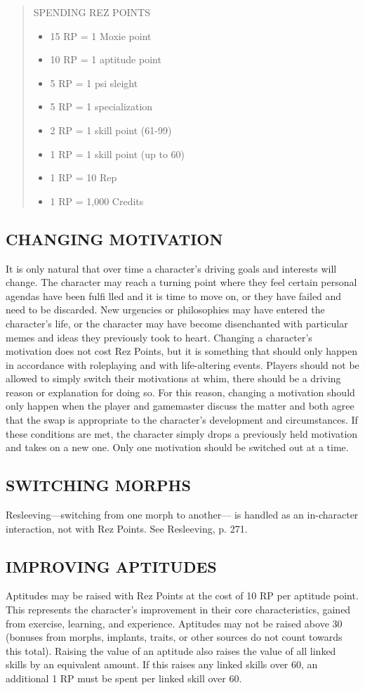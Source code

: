 \begin{quotation}
SPENDING REZ POINTS

\begin{itemize}
\item 15 RP = 1 Moxie point
\item 10 RP = 1 aptitude point
\item 5 RP = 1 psi sleight
\item 5 RP = 1 specialization
\item 2 RP = 1 skill point (61-99)
\item 1 RP = 1 skill point (up to 60)
\item 1 RP = 10 Rep
\item 1 RP = 1,000 Credits
\end{itemize}
\end{quotation}

 \subsection{CHANGING MOTIVATION}
It is only natural that over time a character’s driving
goals and interests will change. The character may
reach a turning point where they feel certain personal
agendas have been fulfi lled and it is time to move on,
or they have failed and need to be discarded. New
urgencies or philosophies may have entered the
character’s life, or the character may have become
disenchanted with particular memes and ideas they
previously took to heart.
Changing a character’s motivation does not cost
Rez Points, but it is something that should only
happen in accordance with roleplaying and with
life-altering events. Players should not be allowed
to simply switch their motivations at whim, there
should be a driving reason or explanation for doing
so. For this reason, changing a motivation should only
happen when the player and gamemaster discuss the
matter and both agree that the swap is appropriate to
the character’s development and circumstances.
If these conditions are met, the character simply
drops a previously held motivation and takes on a
new one. Only one motivation should be switched
out at a time.

 \subsection{SWITCHING MORPHS}
Resleeving—switching from one morph to another—
is handled as an in-character interaction, not with Rez
Points. See Resleeving, p. 271.

 \subsection{IMPROVING APTITUDES}
Aptitudes may be raised with Rez Points at the cost of
10 RP per aptitude point. This represents the character’s
improvement in their core characteristics, gained
from exercise, learning, and experience. Aptitudes may
not be raised above 30 (bonuses from morphs, implants,
traits, or other sources do not count towards
this total).
Raising the value of an aptitude also raises the
value of all linked skills by an equivalent amount. If
this raises any linked skills over 60, an additional 1
RP must be spent per linked skill over 60.

